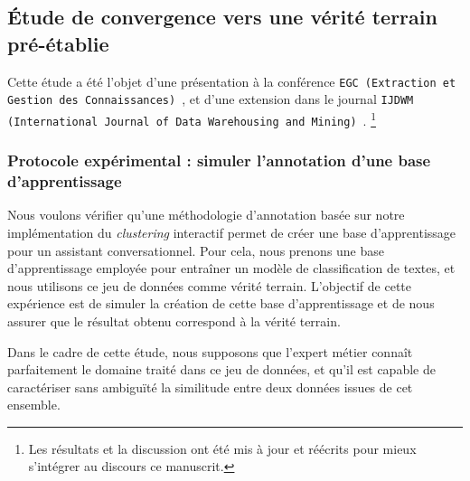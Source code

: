 	\subsection{Étude de convergence vers une vérité terrain pré-établie}
	\label{section:4.1.1-ETUDE-CONVERGENCE}
			
		\begin{leftBarInformation}
			Cette étude a été l'objet d'une présentation à la conférence \texttt{EGC (Extraction et Gestion des Connaissances)}~\citep{schild:conception-interactive-clustering:2021}, et d'une extension dans le journal \texttt{IJDWM (International Journal of Data Warehousing and Mining)}~\citep{schild:extension-interactive-clustering:2022}.
			\footnote{Les résultats et la discussion ont été mis à jour et réécrits pour mieux s'intégrer au discours ce manuscrit.}
		\end{leftBarInformation}

		\subsubsection{Protocole expérimental : simuler l'annotation d'une base d'apprentissage}
		
			Nous voulons vérifier qu'une méthodologie d'annotation basée sur notre implémentation du \textit{clustering} interactif permet de créer une base d'apprentissage pour un assistant conversationnel.
			Pour cela, nous prenons une base d'apprentissage employée pour entraîner un modèle de classification de textes, et nous utilisons ce jeu de données comme vérité terrain.
			L'objectif de cette expérience est de simuler la création de cette base d'apprentissage et de nous assurer que le résultat obtenu correspond à la vérité terrain.
			
			\begin{leftBarWarning}
				Dans le cadre de cette étude, nous supposons que l'expert métier connaît parfaitement le domaine traité dans ce jeu de données, et qu'il est capable de caractériser sans ambiguïté la similitude entre deux données issues de cet ensemble.
			\end{leftBarWarning}
			
